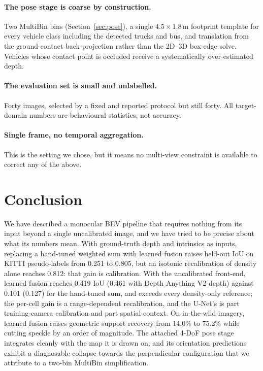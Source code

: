 \documentclass[sigconf]{acmart}
\newcommand{\rev}[1]{{\color{revcolor}#1}}
\begin{document}
\paragraph{The pose stage is coarse by construction.} Two MultiBin bins (Section~\ref{sec:pose}), a single $4.5 \times 1.8$\,m footprint template for every vehicle class including the detected trucks and bus, and translation from the ground-contact back-projection rather than the 2D--3D box-edge solve. Vehicles whose contact point is occluded receive a systematically over-estimated depth.

\paragraph{The evaluation set is small and unlabelled.} Forty images, selected by a fixed and reported protocol but still forty. All target-domain numbers are behavioural statistics, not accuracy.

\paragraph{Single frame, no temporal aggregation.} This is the setting we chose, but it means no multi-view constraint is available to correct any of the above.

\section{Conclusion}

We have described a monocular BEV pipeline that requires nothing from its input beyond a single uncalibrated image, and we have tried to be precise about what its numbers mean. \rev{With ground-truth depth and intrinsics as inputs, replacing a hand-tuned weighted sum with learned fusion raises held-out IoU on KITTI pseudo-labels from 0.251 to 0.805, but an isotonic recalibration of density alone reaches 0.812: that gain is calibration. With the uncalibrated front-end, learned fusion reaches 0.419 IoU (0.461 with Depth Anything V2 depth) against 0.101 (0.127) for the hand-tuned sum, and exceeds every density-only reference; the per-cell gain is a range-dependent recalibration, and the U-Net's is part training-camera calibration and part spatial context.} On in-the-wild imagery, learned fusion raises geometric support recovery from 14.0\% to 75.2\% while cutting speckle by an order of magnitude. The attached 4-DoF pose stage integrates cleanly with the map it is drawn on, and its orientation predictions exhibit a diagnosable collapse towards the perpendicular configuration that we attribute to a two-bin MultiBin simplification.
\end{document}
